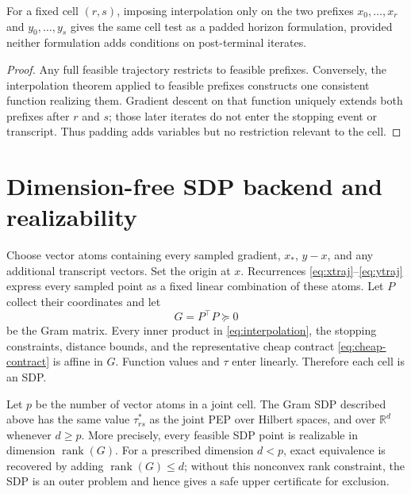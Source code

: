 \documentclass[smallextended]{svjour3}
\newcommand{\R}{\mathbb{R}}
\DeclareMathOperator{\rank}{rank}
\begin{document}
\begin{lemma}
\label{lem:ragged}
For a fixed cell $(r,s)$, imposing interpolation only on the two prefixes
$x_0,\ldots,x_r$ and $y_0,\ldots,y_s$ gives the same cell test as a padded
horizon formulation, provided neither formulation adds conditions on
post-terminal iterates.
\end{lemma}

\begin{proof}
Any full feasible trajectory restricts to feasible prefixes.  Conversely, the
interpolation theorem applied to feasible prefixes constructs one consistent
function realizing them.  Gradient descent on that function uniquely extends
both prefixes after $r$ and $s$; those later iterates do not enter the stopping
event or transcript.  Thus padding adds variables but no restriction relevant
to the cell.
\end{proof}

\section{Dimension-free SDP backend and realizability}
\label{sec:sdp}

Choose vector atoms containing every sampled gradient, $x_*$, $y-x$, and any
additional transcript vectors.  Set the origin at $x$.  Recurrences
\eqref{eq:xtraj}--\eqref{eq:ytraj} express every sampled point as a fixed linear
combination of these atoms.  Let $P$ collect their coordinates and let
\begin{equation}
 G=P^\top P\succeq0                                      \label{eq:gram}
\end{equation}
be the Gram matrix.  Every inner product in
\eqref{eq:interpolation}, the stopping constraints, distance bounds, and the
representative cheap contract \eqref{eq:cheap-contract} is affine in $G$.
Function values and $\tau$ enter linearly.  Therefore each cell is an SDP.

\begin{theorem}
\label{thm:sdp-exact}
Let $p$ be the number of vector atoms in a joint cell.  The Gram SDP described
above has the same value $\tau_{rs}^*$ as the joint PEP over Hilbert spaces, and
over $\R^d$ whenever $d\geq p$.  More precisely, every feasible SDP point is
realizable in dimension $\rank(G)$.  For a prescribed dimension $d<p$, exact
equivalence is recovered by adding $\rank(G)\leq d$; without this nonconvex
rank constraint, the SDP is an outer problem and hence gives a safe upper
certificate for exclusion.
\end{theorem}
\end{document}
